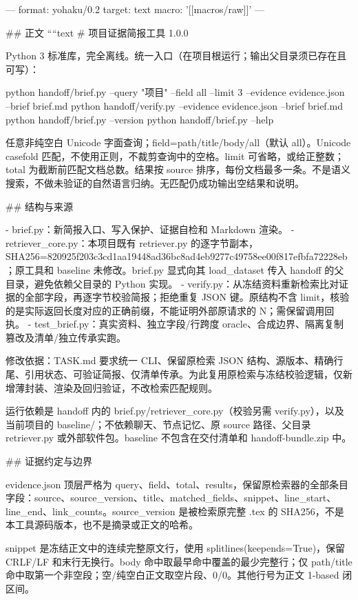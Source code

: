 ---
format: yohaku/0.2
target: text
macro: '[[macros/raw]]'
---

## 正文
````text
# 项目证据简报工具 1.0.0

Python 3 标准库，完全离线。统一入口（在项目根运行；输出父目录须已存在且可写）：

    python handoff/brief.py --query "项目" --field all --limit 3 --evidence evidence.json --brief brief.md
    python handoff/verify.py --evidence evidence.json --brief brief.md
    python handoff/brief.py --version
    python handoff/brief.py --help

任意非纯空白 Unicode 字面查询；field=path/title/body/all（默认 all）。Unicode casefold 匹配，不使用正则，不裁剪查询中的空格。limit 可省略，或给正整数；total 为截断前匹配文档总数。结果按 source 排序，每份文档最多一条。不是语义搜索，不做未验证的自然语言归纳。无匹配仍成功输出空结果和说明。

## 结构与来源

- brief.py：新简报入口、写入保护、证据自检和 Markdown 渲染。
- retriever_core.py：本项目既有 retriever.py 的逐字节副本，SHA256=820925f203c3cd1aa19448ad36bc8ad4eb9277c49758ee00f817efbfa72228eb；原工具和 baseline 未修改。brief.py 显式向其 load_dataset 传入 handoff 的父目录，避免依赖父目录的 Python 实现。
- verify.py：从冻结资料重新检索比对证据的全部字段，再逐字节校验简报；拒绝重复 JSON 键。原结构不含 limit，核验的是实际返回长度对应的正确前缀，不能证明外部原请求的 N；需保留调用回执。
- test_brief.py：真实资料、独立字段/行跨度 oracle、合成边界、隔离复制篡改及清单/独立传承实跑。

修改依据：TASK.md 要求统一 CLI、保留原检索 JSON 结构、源版本、精确行尾、引用状态、可验证简报、仅清单传承。为此复用原检索与冻结校验逻辑，仅新增薄封装、渲染及回归验证，不改检索匹配规则。

运行依赖是 handoff 内的 brief.py/retriever_core.py（校验另需 verify.py），以及当前项目的 baseline/；不依赖聊天、节点记忆、原 source 路径、父目录 retriever.py 或外部软件包。baseline 不包含在交付清单和 handoff-bundle.zip 中。

## 证据约定与边界

evidence.json 顶层严格为 query、field、total、results，保留原检索器的全部条目字段：source、source_version、title、matched_fields、snippet、line_start、line_end、link_counts。source_version 是被检索原完整 .tex 的 SHA256，不是本工具源码版本，也不是摘录或正文的哈希。

snippet 是冻结正文中的连续完整原文行，使用 splitlines(keepends=True)，保留 CRLF/LF 和末行无换行。body 命中取最早命中覆盖的最少完整行；仅 path/title 命中取第一个非空段；空/纯空白正文取空片段、0/0。其他行号为正文 1-based 闭区间。

